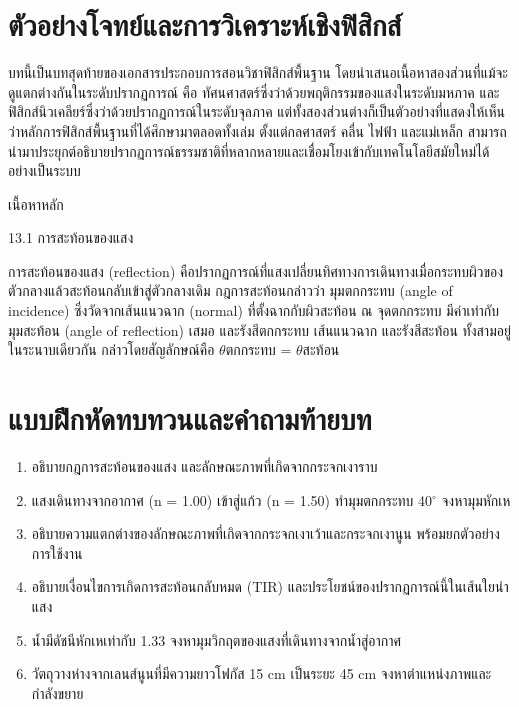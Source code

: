 \section{ตัวอย่างโจทย์และการวิเคราะห์เชิงฟิสิกส์}

\begin{examplebox}
บทนี้เป็นบทสุดท้ายของเอกสารประกอบการสอนวิชาฟิสิกส์พื้นฐาน โดยนำเสนอเนื้อหาสองส่วนที่แม้จะดูแตกต่างกันในระดับปรากฏการณ์ คือ ทัศนศาสตร์ซึ่งว่าด้วยพฤติกรรมของแสงในระดับมหภาค และฟิสิกส์นิวเคลียร์ซึ่งว่าด้วยปรากฏการณ์ในระดับจุลภาค แต่ทั้งสองส่วนต่างก็เป็นตัวอย่างที่แสดงให้เห็นว่าหลักการฟิสิกส์พื้นฐานที่ได้ศึกษามาตลอดทั้งเล่ม ตั้งแต่กลศาสตร์ คลื่น ไฟฟ้า และแม่เหล็ก สามารถนำมาประยุกต์อธิบายปรากฏการณ์ธรรมชาติที่หลากหลายและเชื่อมโยงเข้ากับเทคโนโลยีสมัยใหม่ได้อย่างเป็นระบบ

เนื้อหาหลัก

13.1 การสะท้อนของแสง

การสะท้อนของแสง (reflection) คือปรากฏการณ์ที่แสงเปลี่ยนทิศทางการเดินทางเมื่อกระทบผิวของตัวกลางแล้วสะท้อนกลับเข้าสู่ตัวกลางเดิม กฎการสะท้อนกล่าวว่า มุมตกกระทบ (angle of incidence) ซึ่งวัดจากเส้นแนวฉาก (normal) ที่ตั้งฉากกับผิวสะท้อน ณ จุดตกกระทบ มีค่าเท่ากับมุมสะท้อน (angle of reflection) เสมอ และรังสีตกกระทบ เส้นแนวฉาก และรังสีสะท้อน ทั้งสามอยู่ในระนาบเดียวกัน กล่าวโดยสัญลักษณ์คือ $\theta$ตกกระทบ = $\theta$สะท้อน
\end{examplebox}

\section{แบบฝึกหัดทบทวนและคำถามท้ายบท}

\begin{enumerate}
    \item อธิบายกฎการสะท้อนของแสง และลักษณะภาพที่เกิดจากกระจกเงาราบ
    \item แสงเดินทางจากอากาศ (n = 1.00) เข้าสู่แก้ว (n = 1.50) ทำมุมตกกระทบ 40$^\circ$ จงหามุมหักเห
    \item อธิบายความแตกต่างของลักษณะภาพที่เกิดจากกระจกเงาเว้าและกระจกเงานูน พร้อมยกตัวอย่างการใช้งาน
    \item อธิบายเงื่อนไขการเกิดการสะท้อนกลับหมด (TIR) และประโยชน์ของปรากฏการณ์นี้ในเส้นใยนำแสง
    \item น้ำมีดัชนีหักเหเท่ากับ 1.33 จงหามุมวิกฤตของแสงที่เดินทางจากน้ำสู่อากาศ
    \item วัตถุวางห่างจากเลนส์นูนที่มีความยาวโฟกัส 15 cm เป็นระยะ 45 cm จงหาตำแหน่งภาพและกำลังขยาย
\end{enumerate}

